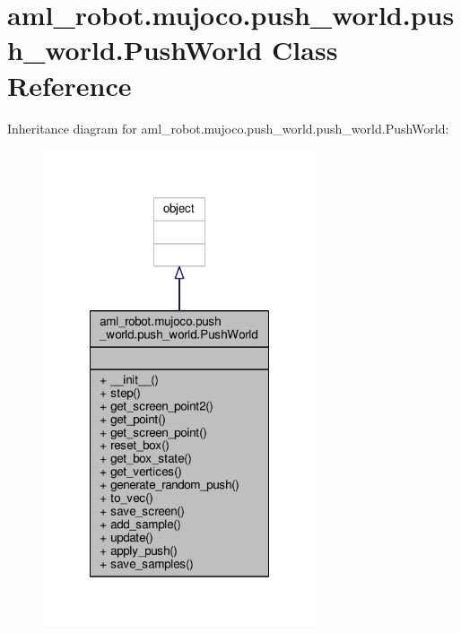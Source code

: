 \hypertarget{classaml__robot_1_1mujoco_1_1push__world_1_1push__world_1_1_push_world}{\section{aml\-\_\-robot.\-mujoco.\-push\-\_\-world.\-push\-\_\-world.\-Push\-World Class Reference}
\label{classaml__robot_1_1mujoco_1_1push__world_1_1push__world_1_1_push_world}
}


Inheritance diagram for aml\-\_\-robot.\-mujoco.\-push\-\_\-world.\-push\-\_\-world.\-Push\-World\-:
\nopagebreak
\begin{figure}[H]
\begin{center}
\leavevmode
\includegraphics[width=228pt]{classaml__robot_1_1mujoco_1_1push__world_1_1push__world_1_1_push_world__inherit__graph}
\end{center}
\end{figure}


